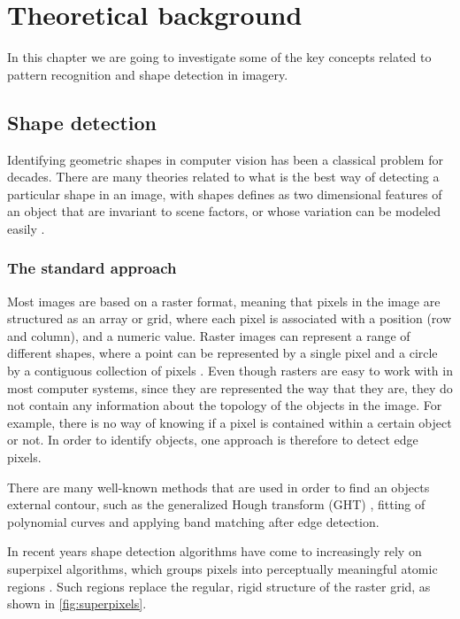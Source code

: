 \chapter{Theoretical background}
In this chapter we are going to investigate some of the key concepts related to pattern recognition and shape detection in imagery. 

\section{Shape detection}
Identifying geometric shapes in computer vision has been a classical problem for decades. There are many theories related to what is the best way of detecting a particular shape in an image, with shapes defines as two dimensional features of an object that are invariant to scene factors, or whose variation can be modeled easily \citep{Moon2002}.

\subsection{The standard approach}
Most images are based on a raster format, meaning that pixels in the image are structured as an array or grid, where each pixel is associated with a position (row and column), and a numeric value. Raster images can represent a range of different shapes, where a point can be represented by a single pixel and a circle by a contiguous collection of pixels \citep{Worboys2003}. Even though rasters are easy to work with in most computer systems, since they are represented the way that they are, they do not contain any information about the topology of the objects in the image. For example, there is no way of knowing if a pixel is contained within a certain object or not. In order to identify objects, one approach is therefore to detect edge pixels.

There are many well-known methods that are used in order to find an objects external contour, such as the generalized Hough transform (GHT) \citep{Ballard1981}, fitting of polynomial curves and applying band matching after edge detection.

In recent years shape detection algorithms have come to increasingly rely on superpixel algorithms, which groups pixels into perceptually meaningful atomic regions \citep{Achanta2012}. Such regions replace the regular, rigid structure of the raster grid, as shown in \autoref{fig:superpixels}.


